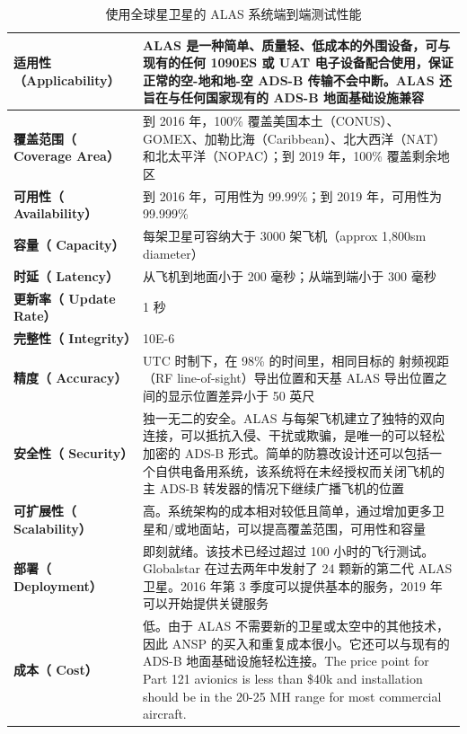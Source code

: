 \renewcommand\arraystretch{1.5}
\begin{table}[!htb]
\centering
\caption{使用全球星卫星的 ALAS 系统端到端测试性能\protect\footnotemark}
\label{tab:alas-paras}
\begin{tabular}[b]{|p{4cm}<{\raggedleft}|p{11cm}<{\raggedright}|}
\hline
\textbf{适用性
（Applicability）} &
ALAS 是一种简单、质量轻、低成本的外围设备，可与现有的任何 1090ES 或 UAT 电子设备配合使用，保证正常的空-地和地-空 ADS-B 传输不会中断。ALAS 还旨在与任何国家现有的 ADS-B 地面基础设施兼容\\
\hline
\textbf{覆盖范围（
Coverage Area）} &
到 2016 年，100\% 覆盖美国本土（CONUS）、GOMEX、加勒比海（Caribbean）、北大西洋（NAT）和北太平洋（NOPAC）；到 2019 年，100\% 覆盖剩余地区\\
\hline
\textbf{可用性（
Availability）} & 到 2016 年，可用性为 99.99\%；到 2019 年，可用性为 99.999\% \\
\hline
\textbf{容量（
Capacity） }& 每架卫星可容纳大于 3000 架飞机（approx 1,800sm diameter）\\
\hline
\textbf{时延（
Latency）} &  从飞机到地面小于 200 毫秒；从端到端小于 300 毫秒 \\
\hline
\textbf{更新率（
Update Rate）} & 1 秒 \\
\hline
\textbf{完整性（
Integrity）} & 10E-6 \\
\hline
\textbf{精度（
Accuracy）} &
UTC 时制下，在 98\% 的时间里，相同目标的 射频视距（RF line-of-sight）导出位置和天基 ALAS 导出位置之间的显示位置差异小于 50 英尺\\
\hline
\textbf{安全性（
Security）} & 独一无二的安全。ALAS 与每架飞机建立了独特的双向连接，可以抵抗入侵、干扰或欺骗，是唯一的可以轻松加密的 ADS-B 形式。简单的防篡改设计还可以包括一个自供电备用系统，该系统将在未经授权而关闭飞机的主 ADS-B 转发器的情况下继续广播飞机的位置 \\
\hline
\textbf{可扩展性（
Scalability）}  & 高。系统架构的成本相对较低且简单，通过增加更多卫星和/或地面站，可以提高覆盖范围，可用性和容量 \\
\hline
\textbf{部署（
Deployment）} & 即刻就绪。该技术已经过超过 100 小时的飞行测试。Globalstar 在过去两年中发射了 24 颗新的第二代 ALAS 卫星。2016 年第 3 季度可以提供基本的服务，2019 年可以开始提供关键服务\\
\hline
\textbf{成本（
Cost）} & 低。由于 ALAS 不需要新的卫星或太空中的其他技术，因此 ANSP 的买入和重复成本很小。它还可以与现有的 ADS-B 地面基础设施轻松连接。The price point for Part 121 avionics is less than \$40k and installation should be in the 20-25 MH range for most commercial aircraft. \\
\hline
\end{tabular}

\end{table}

